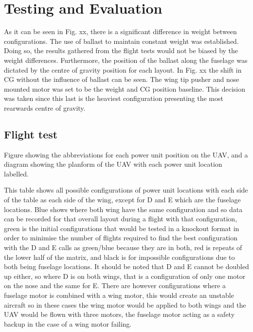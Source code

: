 \documentclass[../../main.tex]{subfiles}
\begin{document}
\chapter{Testing and Evaluation} \label{chapter:testing-and-evaluation}


As it can be seen in Fig. xx, there is a significant difference in weight between configurations.
The use of ballast to maintain constant weight was established.
Doing so, the results gathered from the flight tests would not be biased by the weight differences.
Furthermore, the position of the ballast along the fuselage was dictated by the centre of gravity position for each layout.
In Fig. xx the shift in CG without the influence of ballast can be seen.
The wing tip pusher and nose mounted motor was set to be the weight and CG position baseline.
This decision was taken since this last is the heaviest configuration presenting the most rearwards centre of gravity. 


\section{Flight test} \label{sec:testing-and-evaluation:flight-test}

Figure showing the abbreviations for each power unit position on the UAV, and a diagram showing the planform of the UAV with each power unit location labelled. 


This table shows all possible configurations of power unit locations with each side of the table as each side of the wing, except for D and E which are the fuselage locations.
Blue shows where both wing have the same configuration and so data can be recorded for that overall layout during a flight with that configuration, green is the initial configurations that would be tested in a knockout format in order to minimise the number of flights required to find the best configuration with the D and E calls as green/blue because they are in both, red is repeats of the lower half of the matrix, and black is for impossible configurations due to both being fuselage locations.
It should be noted that D and E cannot be doubled up either, so where D is on both wings, that is a configuration of only one motor on the nose and the same for E.
There are however configurations where a fuselage motor is combined with a wing motor, this would create an unstable aircraft so in these cases the wing motor would be applied to both wings and the UAV would be flown with three motors, the fuselage motor acting as a safety backup in the case of a wing motor failing.
\end{document}
